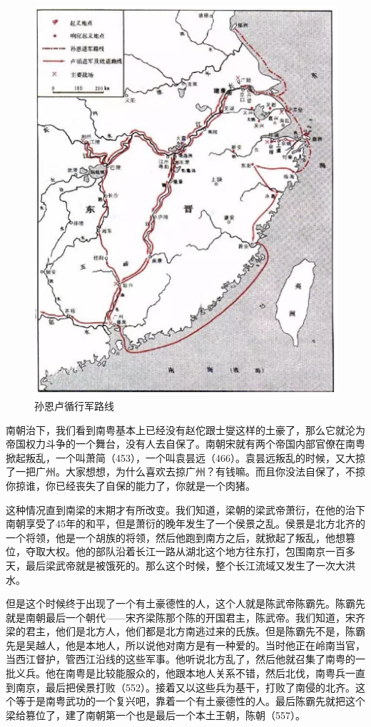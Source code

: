 \begin{figure}
	\centering
	\includegraphics[width=\textwidth]{images/image-19}
	\caption{孙恩卢循行军路线}
\end{figure}

南朝治下，我们看到南粤基本上已经没有赵佗跟士燮这样的土豪了，那么它就沦为帝国权力斗争的一个舞台，没有人去自保了。南朝宋就有两个帝国内部官僚在南粤掀起叛乱，一个叫萧简（453），一个叫袁昙远（466）。袁昙远叛乱的时候，又大掠了一把广州。大家想想，为什么喜欢去掠广州？有钱嘛。而且你没法自保了，不掠你掠谁，你已经丧失了自保的能力了，你就是一个肉猪。

这种情况直到南梁的末期才有所改变。我们知道，梁朝的梁武帝萧衍，在他的治下南朝享受了45年的和平，但是萧衍的晚年发生了一个侯景之乱。侯景是北方北齐的一个将领，他是一个胡族的将领，然后他跑到南方之后，就掀起了叛乱，他想篡位，夺取大权。他的部队沿着长江一路从湖北这个地方往东打，包围南京一百多天，最后梁武帝就是被饿死的。那么这个时候，整个长江流域又发生了一次大洪水。

但是这个时候终于出现了一个有土豪德性的人，这个人就是陈武帝陈霸先。陈霸先就是南朝最后一个朝代——宋齐梁陈那个陈的开国君主，陈武帝。我们知道，宋齐梁的君主，他们是北方人，他们都是北方南逃过来的氏族。但是陈霸先不是，陈霸先是吴越人，他是本地人，所以说他对南方是有一种爱的。当时他正在岭南当官，当西江督护，管西江沿线的这些军事。他听说北方乱了，然后他就召集了南粤的一批义兵。他在南粤是比较能服众的，他跟本地人关系不错，然后北伐，南粤兵一直到南京，最后把侯景打败（552）。接着又以这些兵为基干，打败了南侵的北齐。这个等于是南粤武功的一个复兴吧，靠着一个有土豪德性的人。最后陈霸先就把这个梁给篡位了，建了南朝第一个也是最后一个本土王朝，陈朝（557）。

